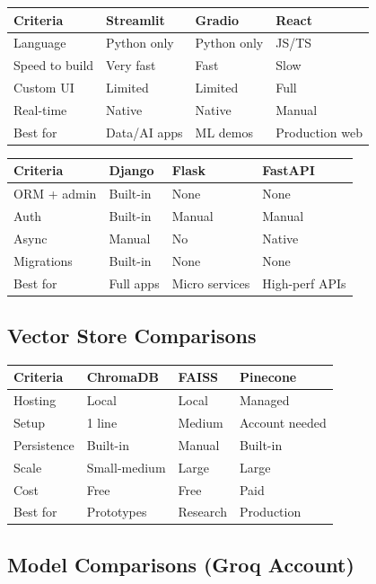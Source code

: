 \begin{longtable}{p{3cm} p{3.8cm} p{3.8cm} p{3.8cm}}
\toprule
\textbf{Criteria} & \textbf{Streamlit} & \textbf{Gradio} & \textbf{React} \\
\midrule
Language & Python only & Python only & JS/TS \\
Speed to build & Very fast & Fast & Slow \\
Custom UI & Limited & Limited & Full \\
Real-time & Native & Native & Manual \\
Best for & Data/AI apps & ML demos & Production web \\
\bottomrule
\end{longtable}

\begin{longtable}{p{3cm} p{3.8cm} p{3.8cm} p{3.8cm}}
\toprule
\textbf{Criteria} & \textbf{Django} & \textbf{Flask} & \textbf{FastAPI} \\
\midrule
ORM + admin & Built-in & None & None \\
Auth & Built-in & Manual & Manual \\
Async & Manual & No & Native \\
Migrations & Built-in & None & None \\
Best for & Full apps & Micro services & High-perf APIs \\
\bottomrule
\end{longtable}

\subsection{Vector Store Comparisons}

\begin{longtable}{p{3cm} p{3.8cm} p{3.8cm} p{3.8cm}}
\toprule
\textbf{Criteria} & \textbf{ChromaDB} & \textbf{FAISS} & \textbf{Pinecone} \\
\midrule
Hosting & Local & Local & Managed \\
Setup & 1 line & Medium & Account needed \\
Persistence & Built-in & Manual & Built-in \\
Scale & Small-medium & Large & Large \\
Cost & Free & Free & Paid \\
Best for & Prototypes & Research & Production \\
\bottomrule
\end{longtable}

\subsection{Model Comparisons (Groq Account)}

